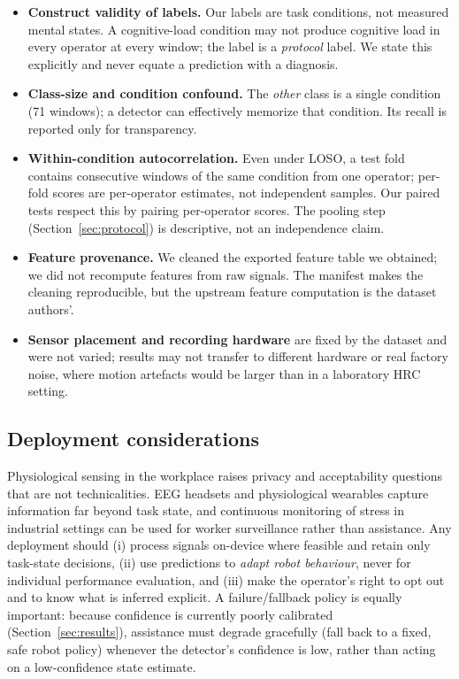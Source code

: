 \documentclass{llncs}
\begin{document}
\begin{itemize}
\item \textbf{Construct validity of labels.} Our labels are task conditions, not
measured mental states. A cognitive-load condition may not produce cognitive load in
every operator at every window; the label is a \emph{protocol} label. We state this
explicitly and never equate a prediction with a diagnosis.
\item \textbf{Class-size and condition confound.} The \emph{other} class is a single
condition (71 windows); a detector can effectively memorize that condition. Its
recall is reported only for transparency.
\item \textbf{Within-condition autocorrelation.} Even under \ac{LOSO}, a test fold
contains consecutive windows of the same condition from one operator; per-fold scores
are per-operator estimates, not independent samples. Our paired tests respect this by
pairing per-operator scores. The pooling step (Section~\ref{sec:protocol}) is
descriptive, not an independence claim.
\item \textbf{Feature provenance.} We cleaned the exported feature table we obtained;
we did not recompute features from raw signals. The manifest makes the cleaning
reproducible, but the upstream feature computation is the dataset authors'.
\item \textbf{Sensor placement and recording hardware} are fixed by the dataset and
were not varied; results may not transfer to different hardware or real factory
noise, where motion artefacts would be larger than in a laboratory \ac{HRC} setting.
\end{itemize}

\subsection{Deployment considerations}

Physiological sensing in the workplace raises privacy and acceptability questions
that are not technicalities. \ac{EEG} headsets and physiological wearables capture
information far beyond task state, and continuous monitoring of stress in industrial
settings can be used for worker surveillance rather than assistance. Any deployment
should (i) process signals on-device where feasible and retain only task-state
decisions, (ii) use predictions to \emph{adapt robot behaviour}, never for individual
performance evaluation, and (iii) make the operator's right to opt out and to know
what is inferred explicit. A failure/fallback policy is equally important: because
confidence is currently poorly calibrated (Section~\ref{sec:results}), assistance
must degrade gracefully (fall back to a fixed, safe robot policy) whenever the
detector's confidence is low, rather than acting on a low-confidence state estimate.
\end{document}
